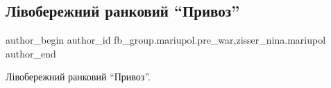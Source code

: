  
 
 
 
 

\subsection{Лівобережний ранковий \enquote{Привоз}}
\label{sec:25_02_2023.fb.fb_group.mariupol.pre_war.4.l_voberezhnii_rankov}
 
\ifcmt
 author_begin
   author_id fb_group.mariupol.pre_war,zisser_nina.mariupol
 author_end
\fi

Лівобережний ранковий \enquote{Привоз}.

